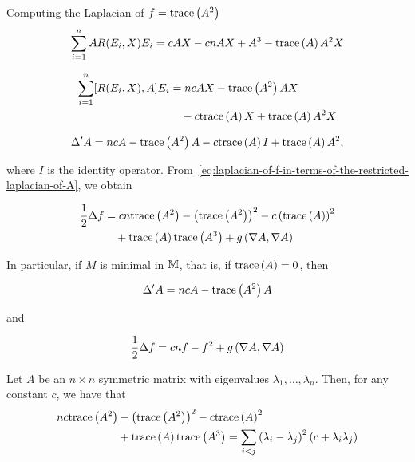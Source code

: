 \begin{frame}[allowframebreaks]{Computing the Laplacian of \(f=\text{trace}\left({A^{2}}\right)\)}
  \[
    \sum_{i=1}^{n}AR(E_{i},X)E_{i}=cAX-cnAX+A^{3}-\text{trace}\left({A}\right)A^{2}X
  \]

  \framebreak

  \begin{align*}
    \sum_{i=1}^{n}[R(E_{i},X),A]E_{i} & =ncAX-\text{trace}\left({A^{2}}\right)AX             \\
                                      & \quad-c\text{trace}\left({A}\right)X+\text{trace}\left({A}\right)A^{2}X
  \end{align*}

  \framebreak

  \begin{equation}\label{eq:restricted-laplacian-of-the-shape-operator}
    \Delta'{A}=ncA-\text{trace}\left({A^{2}}\right)A-c\text{trace}\left({A}\right)I+\text{trace}\left({A}\right)A^{2},
  \end{equation}
  
  where \(I\) is the identity operator.
  From~\eqref{eq:laplacian-of-f-in-terms-of-the-restricted-laplacian-of-A}, we
  obtain

  \begin{equation}\label{eq:final-form-for-the-laplacian-of-f}
    \begin{split}
      \frac{1}{2}\Delta{f} & =cn\text{trace}\left({A^{2}}\right)-\left(\text{trace}\left({A^{2}}\right)\right)^{2}-c\left(\text{trace}\left({A}\right)\right)^{2}   \\
                               & \quad+\text{trace}\left({A}\right)\text{trace}\left({A^{3}}\right)+g\left(\nabla{A},\nabla{A}\right)
    \end{split}
  \end{equation}

  \framebreak

  In particular, if \(M\) is minimal in \(\mathbb{M}\), that is, if
  \(\text{trace}\left({A}\right)=0\), then

  \[
    \Delta'{A}=ncA-\text{trace}\left({A^{2}}\right)A
  \]

  and

  \[
    \frac{1}{2}\Delta{f}=cnf-f^{2}+g\left(\nabla{A},\nabla{A}\right)
  \]
  
  \framebreak

  \begin{lemma}
    Let \(A\) be an \(n\times{n}\) symmetric matrix with eigenvalues
    \(\lambda_{1},\ldots,\lambda_{n}\). Then, for any constant \(c\),
    we have that
    \begin{align*}
      nc\text{trace}\left({A^{2}}\right)&-\left(\text{trace}\left({A^{2}}\right)\right)^{2}-c\text{trace}\left({A}\right)^{2}                                                                  \\
                     & +\text{trace}\left({A}\right)\text{trace}\left({A^{3}}\right)=\sum_{i<j}\left(\lambda_{i}-\lambda_{j}\right)^{2}\left(c+\lambda_{i}\lambda_{j}\right)
    \end{align*}
  \end{lemma}
  

\end{frame}
